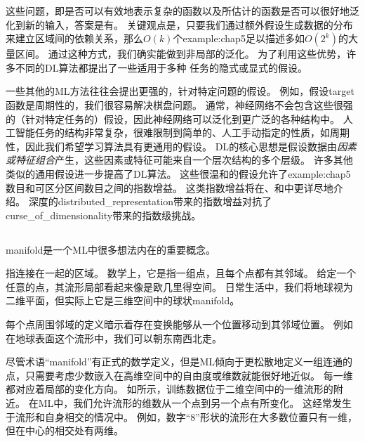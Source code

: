 这些问题，即是否可以有效地表示复杂的函数以及所估计的函数是否可以很好地泛化到新的输入，答案是有。
关键观点是，只要我们通过额外假设生成数据的分布来建立区域间的依赖关系，那么$O(k)$个\gls{example:chap5}足以描述多如$O(2^k)$的大量区间。
通过这种方式，我们确实能做到非局部的泛化\citep{Bengio+Monperrus-2005,Bengio-Larochelle-NLMP-NIPS-2006-short}。
为了利用这些优势，许多不同的\gls{DL}算法都提出了一些适用于多种\,\,任务的隐式或显式的假设。


一些其他的\gls{ML}方法往往会提出更强的，针对特定问题的假设。
例如，假设\gls{target}函数是周期性的，我们很容易解决棋盘问题。
通常，神经网络不会包含这些很强的（针对特定任务的）假设，因此神经网络可以泛化到更广泛的各种结构中。
人工智能任务的结构非常复杂，很难限制到简单的、人工手动指定的性质，如周期性，因此我们希望学习算法具有更通用的假设。
\gls{DL}的核心思想是假设数据由\emph{因素或特征组合}产生，这些因素或特征可能来自一个层次结构的多个层级。
许多其他类似的通用假设进一步提高了\gls{DL}算法。
这些很温和的假设允许了\gls{example:chap5}数目和可区分区间数目之间的指数增益。
这类指数增益将在、和中更详尽地介绍。
深度的\gls{distributed_representation}带来的指数增益对抗了\gls{curse_of_dimensionality}带来的指数级挑战。


\subsection{}
\label{sec:manifold_learning}
\gls{manifold}是一个\gls{ML}中很多想法内在的重要概念。

指连接在一起的区域。
数学上，它是指一组点，且每个点都有其邻域。
给定一个任意的点，其流形局部看起来像是欧几里得空间。
日常生活中，我们将地球视为二维平面，但实际上它是三维空间中的球状\gls{manifold}。

每个点周围邻域的定义暗示着存在变换能够从一个位置移动到其邻域位置。
例如在地球表面这个流形中，我们可以朝东南西北走。

尽管术语``\gls{manifold}''有正式的数学定义，但是\gls{ML}倾向于更松散地定义一组连通的点，只需要考虑少数嵌入在高维空间中的自由度或维数就能很好地近似。
每一维都对应着局部的变化方向。
如所示，训练数据位于二维空间中的一维流形的附近。
在\gls{ML}中，我们允许流形的维数从一个点到另一个点有所变化。
这经常发生于流形和自身相交的情况中。
例如，数字``8''形状的流形在大多数位置只有一维，但在中心的相交处有两维。


